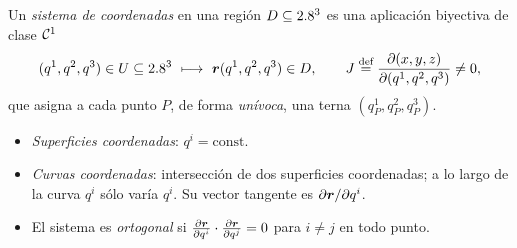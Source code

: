 \begin{definicion}
\label{def:coordenadas}
Un \emph{sistema de coordenadas} en una región $D\subseteq2.8^{3}$ es una
aplicación biyectiva de clase $\mathcal{C}^{1}$
\[
  (q^{1},q^{2},q^{3})\in U\subseteq\R^{3}\ \longmapsto\
  \vb{r}(q^{1},q^{2},q^{3})\in D,
  \qquad
  J\defeq\frac{\partial(x,y,z)}{\partial(q^{1},q^{2},q^{3})}\neq0,
\]
que asigna a cada punto $P$, de forma \emph{unívoca}, una terna
$(q^{1}_{P},q^{2}_{P},q^{3}_{P})$.
\begin{itemize}
  \item \emph{Superficies coordenadas}: $q^{i}=\text{const}$.
  \item \emph{Curvas coordenadas}: intersección de dos superficies
        coordenadas; a lo largo de la curva $q^{i}$ sólo varía $q^{i}$.
        Su vector tangente es $\partial\bm{r}/\partial q^{i}$.
  \item El sistema es \emph{ortogonal} si
        $\frac{\partial \bm{r}}{\partial q^{i}}\cdot\frac{\partial \bm{r}}{\partial q^{j}}=0$ para $i\neq j$ en todo
        punto.
\end{itemize}
\end{definicion}

